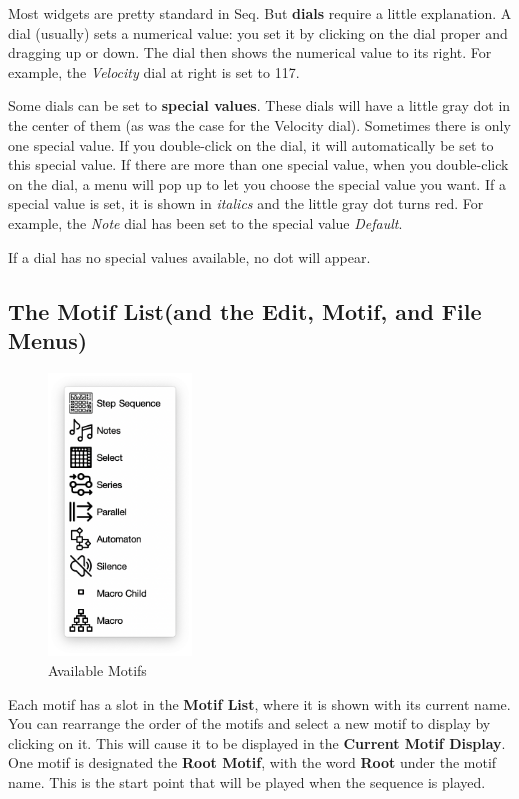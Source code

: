 \documentclass[twoside,10pt]{article}
\begin{document}
Most widgets are pretty standard in Seq.  But {\bf dials} require a little explanation.    A dial (usually) sets a numerical value: you set it by clicking on the dial proper and dragging up or down.  The dial then shows the numerical value to its right.   For example, the {\it Velocity} dial at right is set to 117.  

Some dials can be set to {\bf special values}.  These dials will have a little gray dot in the center of them (as was the case for the Velocity dial).  Sometimes there is only one special value.  If you double-click on the dial, it will automatically be set to this special value. If there are more than one special value, when you double-click on the dial, a menu will pop up to let you choose the special value you want.  If a special value is set, it is shown in {\it italics} and the little gray dot turns red.    For example, the {\it Note} dial  has been set to the special value {\it Default}.

If a dial has no special values available, no dot will appear.


\subsection{The Motif List\quad(and the Edit, Motif, and File Menus)}

\begin{figure}
\vspace{-2em}
\includegraphics[width=1.5in]{motifs}
\vspace{-2em}
\caption{Available Motifs}
\label{motiflist}
\vspace{-1em}
\end{figure}

Each motif has a slot in the {\bf Motif List}, where it is shown with its current name.  You can rearrange the order of the motifs and select a new motif to display by clicking on it.  This will cause it to be displayed in the {\bf Current Motif Display}.  One motif is designated the {\bf Root Motif}, with the word {\bf Root} under the motif name.  This is the start point that will be played when the sequence is played.
\end{document}
